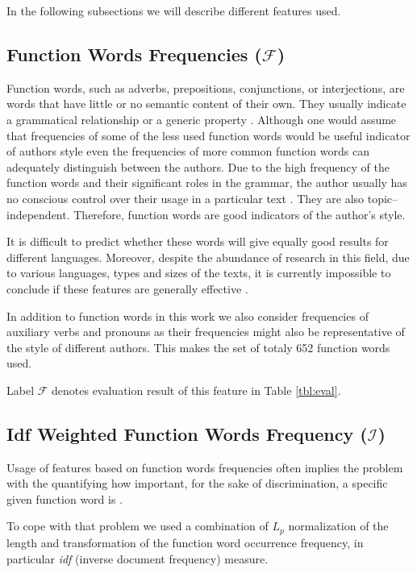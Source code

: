 \documentclass{llncs}
\begin{document}
In the following subsections we will describe different features used.

\subsection{Function Words Frequencies ($\mathcal{F}$)}
\label{sec:funkcijske-rijeci}
Function words, such as adverbs, prepositions, conjunctions, or interjections,
are words that have little or no semantic content of their own. They usually
indicate a grammatical relationship or a generic property
\cite{zhao2005effective}. Although one would assume that frequencies of some of
the less used function words would be useful indicator of authors style even the
frequencies of more common function words can adequately distinguish between the
authors. Due to the high frequency of the function words and their significant
roles in the grammar, the author usually has no conscious control over their
usage in a particular text \cite{argamon2005measuring}. They are also
topic--independent. Therefore, function words are good indicators of the author's
style.

It is difficult to predict whether these words will give equally good results for
different languages. Moreover, despite the abundance of research in this field,
due to various languages, types and sizes of the texts, it is currently
impossible to conclude if these features are generally effective
\cite{zhao2005effective}.

In addition to function words in this work we also consider frequencies of
auxiliary verbs and pronouns as their frequencies might also be
representative of the style of different authors. This makes the set of totaly
652 function words used.

Label $\mathcal{F}$ denotes evaluation result of this feature in Table
\ref{tbl:eval}.

\subsection{Idf Weighted Function Words Frequency ($\mathcal{I}$)}
\label{sec:funkcijske-rijeci-idf}

Usage of features based on function words frequencies often implies the
problem with the quantifying how important, for the sake of discrimination, a
specific given function word is \cite{diederich2003authorship}.

To cope with that problem we used a combination of $L_p$ normalization of the
length and transformation of the function word occurrence frequency, in
particular \emph{idf} (inverse document frequency) measure.
\end{document}
